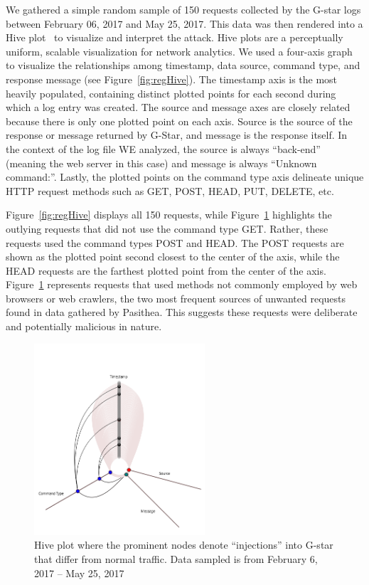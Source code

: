 We gathered a simple random sample of 150 requests collected by the G-star logs between February 06, 2017 and May 25, 2017.  
This data was then rendered into a Hive plot~\cite{Hive-Plot} to visualize and interpret the attack. 
Hive plots are a perceptually uniform, scalable visualization for network analytics.  
We used a four-axis graph to visualize the relationships among timestamp, data source, command type, and response message (see Figure~\ref{fig:regHive}). 
The timestamp axis is the most heavily populated, containing distinct plotted points for each second during which a log entry was created. 
The source and message axes are closely related because there is only one plotted point on each axis. 
Source is the source of the response or message returned by G-Star, and message is the response itself. 
In the context of the log file WE analyzed, the source is always ``back-end'' (meaning the web server in this case) and message is always ``Unknown command:''. 
Lastly, the plotted points on the command type axis delineate unique HTTP request methods such as GET, POST, HEAD, PUT, DELETE, etc.

Figure~\ref{fig:regHive} displays all 150 requests, while Figure~\ref{fig:uniqHive} highlights the outlying requests that did not use the command type GET.  
Rather, these requests used the command types POST and HEAD. 
The POST requests are shown as the plotted point second closest to the center of the axis, while the HEAD requests are the farthest plotted point from the center of the axis. 
Figure~\ref{fig:uniqHive} represents requests that used methods not commonly employed by web browsers or web crawlers, the two most frequent sources of unwanted requests found in data gathered by Pasithea. 
This suggests these requests were deliberate and potentially malicious in nature.

\begin{figure}[t]
   \centering
   \includegraphics[width=2.5in]{images/uniqHive.png} 
   \caption{Hive plot where the prominent nodes denote ``injections'' into G-star that differ from normal traffic. Data sampled is from February 6, 2017 -- May 25, 2017}
   \label{fig:uniqHive}
\end{figure}

